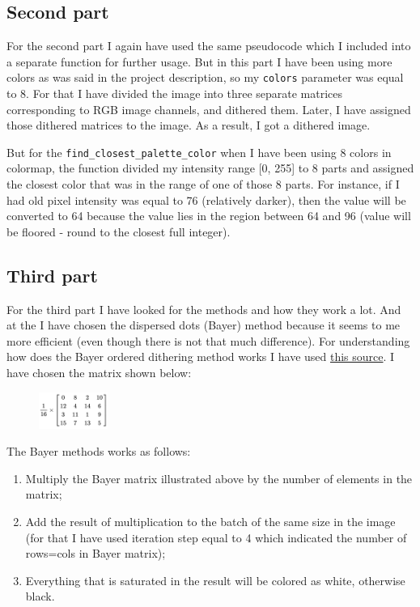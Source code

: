 \documentclass{IEEEtran}
\begin{document}
\subsection{Second part}
For the second part I again have used the same pseudocode which I included into a separate function for further usage. But in this part I have been using more colors as was said in the project description, so my \texttt{colors} parameter was equal to 8. For that I have divided the image into three separate matrices corresponding to RGB image channels, and dithered them. Later, I have assigned those dithered matrices to the image. As a result, I got a dithered image.

But for the \texttt{find{\_}closest{\_}palette{\_}color} when I have been using 8 colors in colormap, the function divided my intensity range [0, 255] to 8 parts and assigned the closest color that was in the range of one of those 8 parts. For instance, if I had old pixel intensity was equal to 76 (relatively darker), then the value will be converted to 64 because the value lies in the region between 64 and 96 (value will be floored - round to the closest full integer).

\subsection{Third part}
For the third part I have looked for the methods and how they work a lot. And at the I have chosen the dispersed dots (Bayer) method because it seems to me more efficient (even though there is not that much difference). For understanding how does the Bayer ordered dithering method works I have used \href{https://youtu.be/UJtV3DdjCVY}{this source}. I have chosen the matrix shown below:

\begin{figure}[h]
	\centering
	\includegraphics[width=0.2\textwidth]{Bayer_matrix.png}
\end{figure}

The Bayer methods works as follows:

\begin{enumerate}
  \item Multiply the Bayer matrix illustrated above by the number of elements in the matrix;
  \item Add the result of multiplication to the batch of the same size in the image (for that I have used iteration step equal to 4 which indicated the number of rows=cols in Bayer matrix);
  \item Everything that is saturated in the result will be colored as white, otherwise black.
\end{enumerate}
\end{document}
